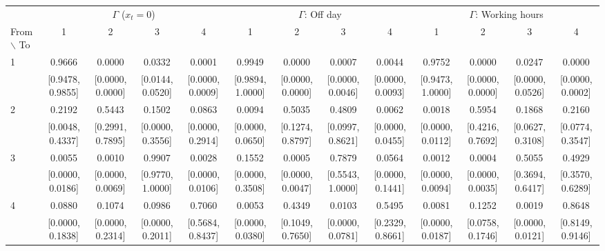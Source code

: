 \begin{table}[H]
\centering
\begin{adjustbox}{max width=\textwidth}
\begin{tabular}{lcccc|cccc|cccc}
\hline
 & \multicolumn{4}{c}{$\Gamma$ ($x_t = 0$)} & \multicolumn{4}{c}{$\Gamma$: Off day} & \multicolumn{4}{c}{$\Gamma$: Working hours} \\
\cmidrule(lr){2-5} \cmidrule(lr){6-9} \cmidrule(lr){10-13}
From $\backslash$ To & 1 & 2 & 3 & 4 & 1 & 2 & 3 & 4 & 1 & 2 & 3 & 4 \\
\hline
1 & 0.9666 & 0.0000 & 0.0332 & 0.0001 & 0.9949 & 0.0000 & 0.0007 & 0.0044 & 0.9752 & 0.0000 & 0.0247 & 0.0000 \\
 & {\footnotesize [0.9478, 0.9855]} & {\footnotesize [0.0000, 0.0000]} & {\footnotesize [0.0144, 0.0520]} & {\footnotesize [0.0000, 0.0009]} & {\footnotesize [0.9894, 1.0000]} & {\footnotesize [0.0000, 0.0000]} & {\footnotesize [0.0000, 0.0046]} & {\footnotesize [0.0000, 0.0093]} & {\footnotesize [0.9473, 1.0000]} & {\footnotesize [0.0000, 0.0000]} & {\footnotesize [0.0000, 0.0526]} & {\footnotesize [0.0000, 0.0002]} \\
2 & 0.2192 & 0.5443 & 0.1502 & 0.0863 & 0.0094 & 0.5035 & 0.4809 & 0.0062 & 0.0018 & 0.5954 & 0.1868 & 0.2160 \\
 & {\footnotesize [0.0048, 0.4337]} & {\footnotesize [0.2991, 0.7895]} & {\footnotesize [0.0000, 0.3556]} & {\footnotesize [0.0000, 0.2914]} & {\footnotesize [0.0000, 0.0650]} & {\footnotesize [0.1274, 0.8797]} & {\footnotesize [0.0997, 0.8621]} & {\footnotesize [0.0000, 0.0455]} & {\footnotesize [0.0000, 0.0112]} & {\footnotesize [0.4216, 0.7692]} & {\footnotesize [0.0627, 0.3108]} & {\footnotesize [0.0774, 0.3547]} \\
3 & 0.0055 & 0.0010 & 0.9907 & 0.0028 & 0.1552 & 0.0005 & 0.7879 & 0.0564 & 0.0012 & 0.0004 & 0.5055 & 0.4929 \\
 & {\footnotesize [0.0000, 0.0186]} & {\footnotesize [0.0000, 0.0069]} & {\footnotesize [0.9770, 1.0000]} & {\footnotesize [0.0000, 0.0106]} & {\footnotesize [0.0000, 0.3508]} & {\footnotesize [0.0000, 0.0047]} & {\footnotesize [0.5543, 1.0000]} & {\footnotesize [0.0000, 0.1441]} & {\footnotesize [0.0000, 0.0094]} & {\footnotesize [0.0000, 0.0035]} & {\footnotesize [0.3694, 0.6417]} & {\footnotesize [0.3570, 0.6289]} \\
4 & 0.0880 & 0.1074 & 0.0986 & 0.7060 & 0.0053 & 0.4349 & 0.0103 & 0.5495 & 0.0081 & 0.1252 & 0.0019 & 0.8648 \\
 & {\footnotesize [0.0000, 0.1838]} & {\footnotesize [0.0000, 0.2314]} & {\footnotesize [0.0000, 0.2011]} & {\footnotesize [0.5684, 0.8437]} & {\footnotesize [0.0000, 0.0380]} & {\footnotesize [0.1049, 0.7650]} & {\footnotesize [0.0000, 0.0781]} & {\footnotesize [0.2329, 0.8661]} & {\footnotesize [0.0000, 0.0187]} & {\footnotesize [0.0758, 0.1746]} & {\footnotesize [0.0000, 0.0121]} & {\footnotesize [0.8149, 0.9146]} \\

\end{tabular}
\end{adjustbox}
\end{table}
